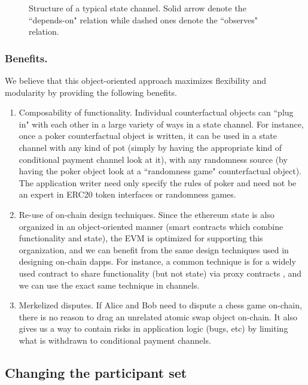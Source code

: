 \documentclass[prb,floatfix,reprint,nofootinbib,amsmath,amssymb,epsfig,pre,floats,letterpaper,groupedaffiliation,tightenlines,allcolors=blue,11pt]{revtex4}
\theoremstyle{definition}
\theoremstyle{definition}
\theoremstyle{definition}
\begin{document}
\begin{figure}[H]
    \centering
    
    \caption{Structure of a typical state channel. Solid arrow denote the ``depends-on" relation while dashed ones denote the ``observes" relation.}
\end{figure}

\subsubsection{Benefits.} We believe that this object-oriented approach maximizes flexibility and modularity by providing the following benefits.

\begin{enumerate}
  \item Composability of functionality. Individual counterfactual objects can ``plug in" with each other in a large variety of ways in a state channel. For instance, once a poker counterfactual object is written, it can be used in a state channel with any kind of pot (simply by having the appropriate kind of conditional payment channel look at it), with any randomness source (by having the poker object look at a ``randomness game" counterfactual object). The application writer need only specify the rules of poker and need not be an expert in ERC20 token interfaces or randomness games.
  \item Re-use of on-chain design techniques. Since the ethereum state is also organized in an object-oriented manner (smart contracts which combine functionality and state), the EVM is optimized for supporting this organization, and we can benefit from the same design techniques used in designing on-chain dapps. For instance, a common technique is for a widely used contract to share functionality (but not state) via proxy contracts \cite{EIP897}, and we can use the exact same technique in channels.
  \item Merkelized disputes. If Alice and Bob need to dispute a chess game on-chain, there is no reason to drag an unrelated atomic swap object on-chain. It also gives us a way to contain risks in application logic (bugs, etc) by limiting what is withdrawn to conditional payment channels.
\end{enumerate}

\subsection{Changing the participant set}
\end{document}
